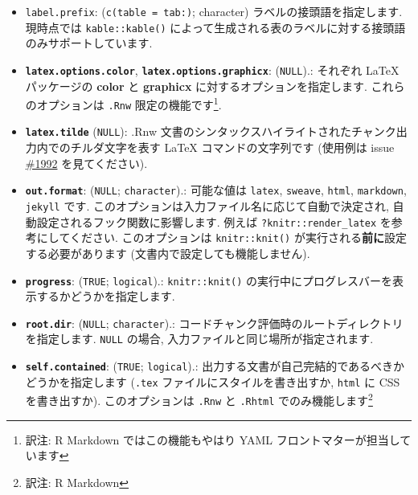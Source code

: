 \documentclass[
  lualatex,ja=standard,jafont=noto-otf]{bxjsreport}
\begin{document}
\begin{itemize}
  LaTeX プリアンブルや HTML
  ヘッダでコマンドやスタイルの定義をするのに有用です.
  ドキュメントの開始地点は
  \texttt{knitr::knit\_patterns\$get(\textquotesingle{}document.begin\textquotesingle{})}
  で知ることができます. このオプションは \texttt{.Rnw} と
  \texttt{.Rhtml} 限定の機能です\footnote{訳注: R Markdown
    ではヘッダの設定は YAML フロントマターで行います}.
\item
  \texttt{label.prefix}:
  (\texttt{c(table\ =\ \textquotesingle{}tab:\textquotesingle{})};
  character) ラベルの接頭語を指定します. 現時点では
  \texttt{kable::kable()}
  によって生成される表のラベルに対する接頭語のみサポートしています.
\item
  \textbf{\texttt{latex.options.color}},
  \textbf{\texttt{latex.options.graphicx}}: (\texttt{NULL}).: それぞれ
  LaTeX パッケージの \textbf{color} と \textbf{graphicx}
  に対するオプションを指定します. これらのオプションは \texttt{.Rnw}
  限定の機能です\footnote{訳注: R Markdown ではこの機能もやはり YAML
    フロントマターが担当しています}.
\item
  \textbf{\texttt{latex.tilde}} (\texttt{NULL}): .Rnw
  文書のシンタックスハイライトされたチャンク出力内でのチルダ文字を表す
  LaTeX コマンドの文字列です (使用例は issue
  \href{https://github.com/yihui/knitr/issues/1992}{\#1992}
  を見てください).
\item
  \textbf{\texttt{out.format}}: (\texttt{NULL}; \texttt{character}).:
  可能な値は \texttt{latex}, \texttt{sweave}, \texttt{html},
  \texttt{markdown}, \texttt{jekyll} です.
  このオプションは入力ファイル名に応じて自動で決定され,
  自動設定されるフック関数に影響します. 例えば
  \texttt{?knitr::render\_latex} を参考にしてください. このオプションは
  \texttt{knitr::knit()} が実行される\textbf{前に}設定する必要があります
  (文書内で設定しても機能しません).
\item
  \textbf{\texttt{progress}}: (\texttt{TRUE}; \texttt{logical}).:
  \texttt{knitr::knit()}
  の実行中にプログレスバーを表示するかどうかを指定します.
\item
  \textbf{\texttt{root.dir}}: (\texttt{NULL}; \texttt{character}).:
  コードチャンク評価時のルートディレクトリを指定します. \texttt{NULL}
  の場合, 入力ファイルと同じ場所が指定されます.
\item
  \textbf{\texttt{self.contained}}: (\texttt{TRUE}; \texttt{logical}).:
  出力する文書が自己完結的であるべきかどうかを指定します (\texttt{.tex}
  ファイルにスタイルを書き出すか, \texttt{html} に CSS を書き出すか).
  このオプションは \texttt{.Rnw} と \texttt{.Rhtml}
  でのみ機能します\footnote{訳注: R Markdown
}
\end{itemize}
\end{document}
